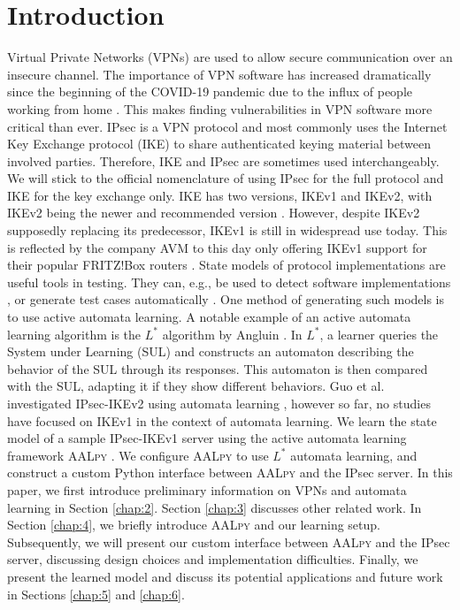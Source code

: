 \documentclass[runningheads]{llncs}
\begin{document}
\section{Introduction}
Virtual Private Networks (VPNs) are used to allow secure communication over an insecure channel. The importance of VPN software has increased dramatically since the beginning of the COVID-19 pandemic due to the influx of people working from home \cite{abhijith2020impact}. This makes finding vulnerabilities in VPN software more critical than ever. IPsec is a VPN protocol and most commonly uses the Internet Key Exchange protocol (IKE) to share authenticated keying material between involved parties. Therefore, IKE and IPsec are sometimes used interchangeably. We will stick to the official nomenclature of using IPsec for the full protocol and IKE for the key exchange only. IKE has two versions, IKEv1 and IKEv2, with IKEv2 being the newer and recommended version \cite{nist791491}. However, despite IKEv2 supposedly replacing its predecessor, IKEv1 is still in widespread use today. This is reflected by the company AVM to this day only offering IKEv1 support for their popular FRITZ!Box routers \cite{avm2022}.
State models of protocol implementations are useful tools in testing. They can, e.g., be used to detect software implementations \cite{pferscher2021fingerprinting}, or generate test cases automatically \cite{pferscher2022fuzzing}. One method of generating such models is to use active automata learning. A notable example of an active automata learning algorithm is the $L^*$ algorithm by Angluin \cite{angluin1987learning}. In $L^*$, a learner queries the System under Learning (SUL) and constructs an automaton describing the behavior of the SUL through its responses. This automaton is then compared with the SUL, adapting it if they show different behaviors. Guo et al.~\cite{guo2019model} investigated IPsec-IKEv2 using automata learning \cite{guo2019model}, however so far, no studies have focused on IKEv1 in the context of automata learning. 
We learn the state model of a sample IPsec-IKEv1 server using the active automata learning framework \textsc{AALpy} \cite{muvskardin2022AALpy}. We configure \textsc{AALpy} to use $L^*$ automata learning, and construct a custom Python interface between \textsc{AALpy} and the IPsec server.
In this paper, we first introduce preliminary information on VPNs and automata learning in Section \ref{chap:2}. Section \ref{chap:3} discusses other related work. In Section \ref{chap:4}, we briefly introduce \textsc{AALpy} and our learning setup. Subsequently, we will present our custom interface between \textsc{AALpy} and the IPsec server, discussing design choices and implementation difficulties. Finally, we present the learned model and discuss its potential applications and future work in Sections \ref{chap:5} and \ref{chap:6}.
\end{document}
